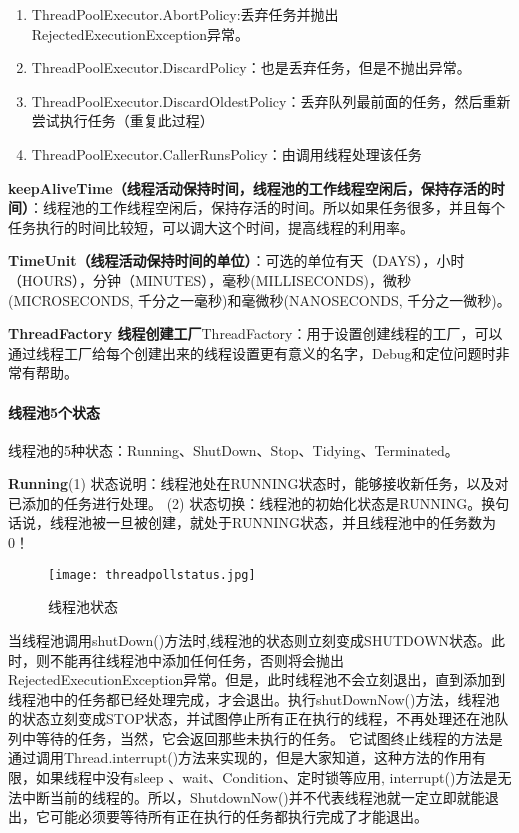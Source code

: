 \documentclass[../../../interview-questions.tex]{subfiles}
\begin{document}
\begin{enumerate}
    \item {ThreadPoolExecutor.AbortPolicy:丢弃任务并抛出RejectedExecutionException异常。}
    \item {ThreadPoolExecutor.DiscardPolicy：也是丢弃任务，但是不抛出异常。}
    \item {ThreadPoolExecutor.DiscardOldestPolicy：丢弃队列最前面的任务，然后重新尝试执行任务（重复此过程）}
    \item {ThreadPoolExecutor.CallerRunsPolicy：由调用线程处理该任务}
\end{enumerate}

\textbf{keepAliveTime（线程活动保持时间，线程池的工作线程空闲后​​​，​​保持存活的时间​​​）}：线程池的工作线程空闲后，保持存活的时间。所以如果任务很多，并且每个任务执行的时间比较短，可以调大这个时间，提高线程的利用率。

\textbf{TimeUnit（线程活动保持时间的单位）}：可选的单位有天（DAYS），小时（HOURS），分钟（MINUTES），毫秒(MILLISECONDS)，微秒(MICROSECONDS, 千分之一毫秒)和毫微秒(NANOSECONDS, 千分之一微秒)。

\textbf{ThreadFactory 线程创建工厂}ThreadFactory：用于设置创建线程的工厂，可以通过线程工厂给每个创建出来的线程设置更有意义的名字，Debug和定位问题时非常有帮助。

\paragraph{线程池5个状态}

线程池的5种状态：Running、ShutDown、Stop、Tidying、Terminated。

\textbf{Running}(1) 状态说明：线程池处在RUNNING状态时，能够接收新任务，以及对已添加的任务进行处理。
(2) 状态切换：线程池的初始化状态是RUNNING。换句话说，线程池被一旦被创建，就处于RUNNING状态，并且线程池中的任务数为0！

\begin{figure}[htbp]
	\centering
	\texttt{[image: threadpollstatus.jpg]}
	\caption{线程池状态}
	\label{fig:threadpollstatus}
\end{figure}

当线程池调用shutDown()方法时,线程池的状态则立刻变成SHUTDOWN状态。此时，则不能再往线程池中添加任何任务，否则将会抛出RejectedExecutionException异常。但是，此时线程池不会立刻退出，直到添加到线程池中的任务都已经处理完成，才会退出。执行shutDownNow()方法，线程池的状态立刻变成STOP状态，并试图停止所有正在执行的线程，不再处理还在池队列中等待的任务，当然，它会返回那些未执行的任务。 
它试图终止线程的方法是通过调用Thread.interrupt()方法来实现的，但是大家知道，这种方法的作用有限，如果线程中没有sleep 、wait、Condition、定时锁等应用, interrupt()方法是无法中断当前的线程的。所以，ShutdownNow()并不代表线程池就一定立即就能退出，它可能必须要等待所有正在执行的任务都执行完成了才能退出。 
\end{document}
